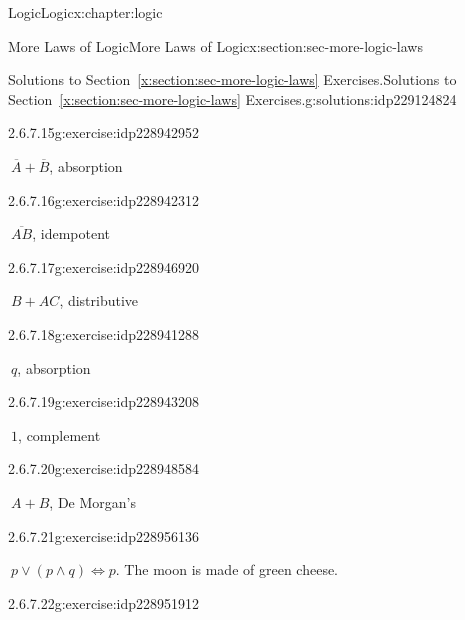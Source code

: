 \documentclass[twoside,10pt,]{book}
\newcommand{\xreffont}{\relax}
\numberwithin{equation}{section}
\begin{document}
\begin{chapterptx}{Logic}{}{Logic}{}{}{x:chapter:logic}
\begin{sectionptx}{More Laws of Logic}{}{More Laws of Logic}{}{}{x:section:sec-more-logic-laws}
\begin{solutions-subsection}{Solutions to Section~{\xreffont\ref*{x:section:sec-more-logic-laws}} Exercises.}{}{Solutions to Section~{\xreffont\ref*{x:section:sec-more-logic-laws}} Exercises.}{}{}{g:solutions:idp229124824}
\begin{exercisegroup}
\end{exercisegroup}
\par\medskip\noindent
\begin{exercisegroup}
\begin{divisionsolutioneg}{2.6.7.15}{}{g:exercise:idp228942952}%
\par\smallskip%
\noindent\hypertarget{g:solution:idp228945128-main}{}\(\ \overline{A}{}+ \overline{B}{}\), absorption\end{divisionsolutioneg}%
\begin{divisionsolutioneg}{2.6.7.16}{}{g:exercise:idp228942312}%
\par\smallskip%
\noindent\hypertarget{g:solution:idp228947944-main}{}\(\ \overline{AB}\), idempotent\end{divisionsolutioneg}%
\begin{divisionsolutioneg}{2.6.7.17}{}{g:exercise:idp228946920}%
\par\smallskip%
\noindent\hypertarget{g:solution:idp228947560-main}{}\(\ B+AC \), distributive\end{divisionsolutioneg}%
\begin{divisionsolutioneg}{2.6.7.18}{}{g:exercise:idp228941288}%
\par\smallskip%
\noindent\hypertarget{g:solution:idp228941544-main}{}\(\ q\), absorption\end{divisionsolutioneg}%
\begin{divisionsolutioneg}{2.6.7.19}{}{g:exercise:idp228943208}%
\par\smallskip%
\noindent\hypertarget{g:solution:idp228954088-main}{}\(\ 1\), complement\end{divisionsolutioneg}%
\begin{divisionsolutioneg}{2.6.7.20}{}{g:exercise:idp228948584}%
\par\smallskip%
\noindent\hypertarget{g:solution:idp228952936-main}{}\(\ A+B\), De Morgan's\end{divisionsolutioneg}%
\end{exercisegroup}
\par\medskip\noindent
\begin{exercisegroup}
\begin{divisionsolutioneg}{2.6.7.21}{}{g:exercise:idp228956136}%
\par\smallskip%
\noindent\hypertarget{g:solution:idp228955368-main}{}\(\ p {\vee}{} (p {\wedge}{} q) {\Leftrightarrow}{}  p\). The moon is made of green cheese.\end{divisionsolutioneg}%
\begin{divisionsolutioneg}{2.6.7.22}{}{g:exercise:idp228951912}%

\end{divisionsolutioneg}
\end{exercisegroup}
\end{solutions-subsection}
\end{sectionptx}
\end{chapterptx}
\end{document}
